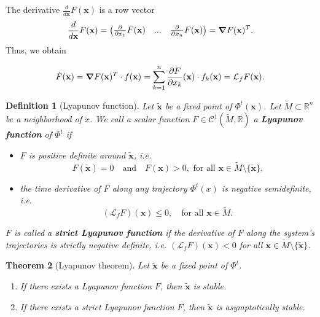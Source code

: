 \documentclass[hidelinks,a4paper, 11pt]{article}
\theoremstyle{plain}
\newtheorem{theorem}{Theorem}
\theoremstyle{break}
\theoremstyle{plain}
\newtheorem{definition}[theorem]{Definition}
\theoremstyle{definition}
\begin{document}
The derivative $\frac{d}{d\mathbf x} F(\mathbf x)$ is a row vector
\[
	\frac{d}{d\mathbf x}F(\mathbf x) = \begin{pmatrix}\frac{\partial}{\partial x_1}F(\mathbf x) & ... &  \frac{\partial}{\partial x_n}F(\mathbf x) \end{pmatrix} = \grad{F(\mathbf x)}^T.
\]
Thus, we obtain
\begin{framed}
\[
	\dot F(\mathbf x) = \grad{F(\mathbf x)}^T \cdot f(\mathbf x) = \sum^n_{k=1} \frac{\partial F}{\partial x_k}(\mathbf x) \cdot f_k(\mathbf x) = \mathcal L_fF(\mathbf x).
\]
\end{framed}

\begin{definition}[Lyapunov function]
Let $\mathbf{\tilde x}$ be a fixed point of $\Phi^t(\mathbf x)$. Let $\tilde M \subset \mathbb R^n$ be a neighborhood of $\tilde x$. We call a scalar function $F \in \mathcal C^{1}(\tilde M, \mathbb R)$ a \textbf{Lyapunov function} of $\Phi^t$ if
\begin{itemize}
	\item $F$ is \emph{positive definite} around $\mathbf{\tilde x}$, i.e. 
	\[
		F(\mathbf{\tilde x}) = 0 \quad \text{and} \quad F(\mathbf x) > 0, \text{ for all $\mathbf x \in \tilde M \setminus \{ \mathbf{\tilde x} \}$,}
	\]
	\item the time derivative of $F$ along any trajectory $\Phi^t(x)$ is \emph{negative semidefinite}, i.e.
	\[
		(\mathcal L_fF)(\mathbf x) \leq 0, \quad \text{for all $\mathbf x \in \tilde M$}.
	\]
\end{itemize}
$F$ is called a \textbf{strict Lyapunov function} if the derivative of $F$ along the system's trajectories is \emph{strictly negative definite}, i.e. $(\mathcal L_fF)(\mathbf x) < 0$ for all $\mathbf x \in \tilde M \setminus \{ \mathbf{\tilde x} \}$.
\end{definition}

\begin{theorem}[Lyapunov theorem]\label{theorem-lyapunov}
	Let $\mathbf{\tilde x}$ be a fixed point of $\Phi^t$.
	\begin{enumerate}
		\item If there exists a Lyapunov function $F$, then $\mathbf{\tilde x}$ is stable. \label{theorem:lyapunov-theorem-one}
		\item If there exists a strict Lyapunov function $F$, then $\mathbf{\tilde x}$ is asymptotically stable.
	\end{enumerate}
\end{theorem}
\end{document}
